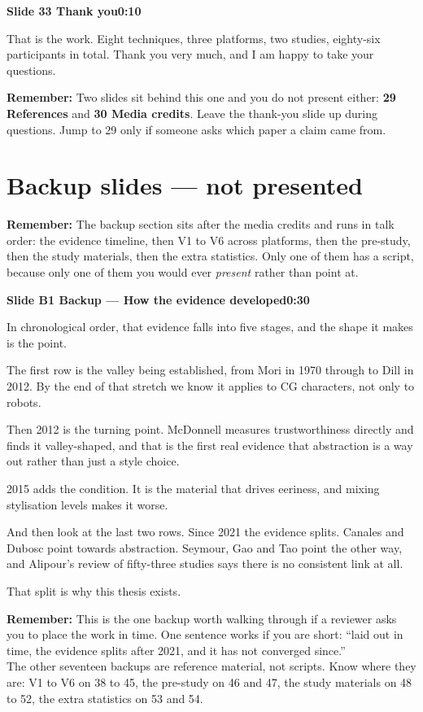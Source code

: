 \documentclass[11pt,a4paper]{article}
\newcommand{\slidehead}[3]{%
  \needspace{5\baselineskip}
  \vspace{0.9em}
  \noindent\colorbox{knblue}{\parbox{0.978\textwidth}{\vspace{1pt}\color{white}\textbf{Slide #1 \quad #2}\hfill\textbf{#3}\vspace{1pt}}}
  \vspace{0.35em}\par}
\newcommand{\remind}[1]{%
  \vspace{0.15em}
  \noindent\colorbox{knlight}{\parbox{0.972\textwidth}{\small\color{knblue}\textbf{Remember:} #1}}
  \vspace{0.2em}\par}
\begin{document}
\slidehead{33}{Thank you}{0:10}

That is the work. Eight techniques, three platforms, two studies, eighty-six participants in total. Thank you very much, and I am happy to take your questions.

\remind{Two slides sit behind this one and you do not present either: \textbf{29 References} and \textbf{30 Media credits}. Leave the thank-you slide up during questions. Jump to 29 only if someone asks which paper a claim came from.}

\clearpage

\clearpage

\section*{\color{knblue}Backup slides — not presented}

\remind{The backup section sits after the media credits and runs in talk order: the evidence timeline, then V1 to V6 across platforms, then the pre-study, then the study materials, then the extra statistics. Only one of them has a script, because only one of them you would ever \emph{present} rather than point at.}

\slidehead{B1}{Backup — How the evidence developed}{0:30}

In chronological order, that evidence falls into five stages, and the shape it makes is the point.

The first row is the valley being established, from Mori in 1970 through to Dill in 2012. By the end of that stretch we know it applies to CG characters, not only to robots.

Then 2012 is the turning point. McDonnell measures trustworthiness directly and finds it valley-shaped, and that is the first real evidence that abstraction is a way out rather than just a style choice.

2015 adds the condition. It is the material that drives eeriness, and mixing stylisation levels makes it worse.

And then look at the last two rows. Since 2021 the evidence splits. Canales and Dubosc point towards abstraction. Seymour, Gao and Tao point the other way, and Alipour's review of fifty-three studies says there is no consistent link at all.

That split is why this thesis exists.

\remind{This is the one backup worth walking through if a reviewer asks you to place the work in time. One sentence works if you are short: ``laid out in time, the evidence splits after 2021, and it has not converged since.''\\[0.4em] The other seventeen backups are reference material, not scripts. Know where they are: V1 to V6 on 38 to 45, the pre-study on 46 and 47, the study materials on 48 to 52, the extra statistics on 53 and 54.}
\end{document}
